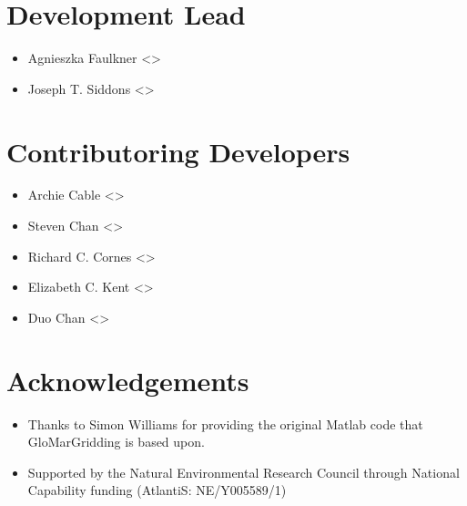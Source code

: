 \documentclass[letterpaper,10pt,english]{sphinxmanual}
\begin{document}
\section{Development Lead}
\label{\detokenize{authors:development-lead}}\begin{itemize}
\item {}
\sphinxAtStartPar
Agnieszka Faulkner \textless{}\textgreater{} 

\item {}
\sphinxAtStartPar
Joseph T. Siddons \textless{}\textgreater{} 

\end{itemize}


\section{Contributoring Developers}
\label{\detokenize{authors:contributoring-developers}}\begin{itemize}
\item {}
\sphinxAtStartPar
Archie Cable \textless{}\textgreater{} 

\item {}
\sphinxAtStartPar
Steven Chan \textless{}\textgreater{} 

\item {}
\sphinxAtStartPar
Richard C. Cornes \textless{}\textgreater{} 

\item {}
\sphinxAtStartPar
Elizabeth C. Kent \textless{}\textgreater{} 

\item {}
\sphinxAtStartPar
Duo Chan \textless{}\textgreater{}

\end{itemize}


\section{Acknowledgements}
\label{\detokenize{authors:acknowledgements}}\begin{itemize}
\item {}
\sphinxAtStartPar
Thanks to Simon Williams for providing the original Matlab code that GloMarGridding is based upon.

\item {}
\sphinxAtStartPar
Supported by the Natural Environmental Research Council through National Capability funding
(AtlantiS: NE/Y005589/1)

\end{itemize}
\end{document}
